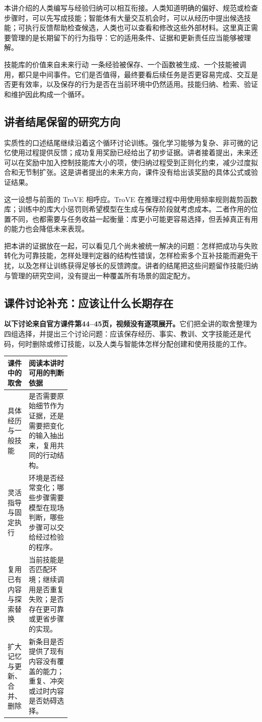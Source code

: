 \documentclass[11pt,a4paper]{article}
\begin{document}
本讲介绍的人类编写与经验归纳可以相互衔接。人类知道明确的偏好、规范或检查步骤时，可以先写成技能；智能体有大量交互机会时，可以从经历中提出候选技能；可执行反馈帮助检查候选，人类也可以查看和修改这些外部材料。这里真正需要管理的是长期留下的行为指导：它的适用条件、证据和更新责任应当能够被理解。

\begin{importantbox}{技能库的价值来自未来行动}
一条经验被保存、一个函数被生成、一个技能被调用，都只是中间事件。它们是否值得，最终要看后续任务是否更容易完成、交互是否更有效率，以及保存的行为是否在当前环境中仍然适用。技能归纳、检索、验证和维护因此构成一个循环。
\end{importantbox}

\subsection{讲者结尾保留的研究方向}

实质性的口述结尾继续沿着这个循环讨论训练。强化学习能够为复杂、非可微的记忆使用过程提供反馈；成功复用奖励已经给出了初步证据。讲者接着提出，未来还可以在奖励中加入控制技能库大小的项，使归纳过程受到正则化约束，减少过度拟合和无节制扩张。这是讲者提出的未来方向，课件没有给出该奖励的具体公式或验证结果。

这一设想与前面的 TroVE 相呼应。TroVE 在推理过程中用使用频率规则裁剪函数库；训练中的库大小惩罚则希望模型在生成与保存阶段就考虑成本。二者作用的位置不同，也都需要与任务收益一起衡量：库更小可能更容易选择，但丢掉真正有用的能力也会降低未来表现。

把本讲的证据放在一起，可以看见几个尚未被统一解决的问题：怎样把成功与失败转化为可靠技能，怎样处理判定器的结构性错误，怎样检索多个互补技能而避免干扰，以及怎样让训练获得足够长的反馈跨度。讲者的结尾把这些问题留作技能归纳与管理的研究空间，没有提出一种覆盖所有场景的固定配方。

\subsection{课件讨论补充：应该让什么长期存在}

\textbf{以下讨论来自官方课件第44--45页，视频没有逐项展开。}它们把全讲的取舍整理为四组选择，并提出三个讨论问题：应该保存经历、事实、教训、文字技能还是代码，何时删除或修订技能，以及人类与智能体怎样分配创建和使用技能的工作。

\begin{center}
\small
\begin{tabularx}{\linewidth}{@{}p{0.25\linewidth}X@{}}
\toprule
课件中的取舍 & 阅读本讲时可用的判断依据\\
\midrule
具体经历与一般技能 & 是否需要原始细节作为证据，还是需要把变化的输入抽出来，复用共同的行动结构。\\
灵活指导与固定执行 & 环境是否经常变化；哪些步骤需要模型在现场判断，哪些步骤可以交给经过检验的程序。\\
复用已有内容与探索替换 & 当前技能是否匹配环境；继续调用是否重复失败；是否存在更可靠或更省步骤的实现。\\
扩大记忆与更新、合并、删除 & 新条目是否提供了现有内容没有覆盖的能力；重复、冲突或过时内容是否妨碍选择。\\
\bottomrule
\end{tabularx}
\end{center}
\end{document}
